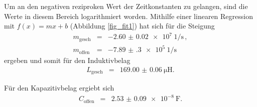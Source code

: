 Um an den negativen reziproken Wert der Zeitkonstanten zu gelangen, sind die Werte in diesem Bereich logarithmiert worden.
Mithilfe einer linearen Regression mit $f(x)=mx+b$ (Abbildung \ref{fig_fit1}) hat sich für die Steigung
\begin{eqnarray*}
	m_\text{gesch} &=& \SI{-2.60(2)e7}{1\per\second}\,,\\
	m_\text{offen} &=& \SI{-7.89(30)e5}{1\per\second}
	\end{eqnarray*}
ergeben und somit für den Induktivbelag
\begin{eqnarray*}
	L_\text{gesch} &=& \SI{169.00(6)}{\micro\henry}.
\end{eqnarray*}

Für den Kapazitivbelag ergiebt sich
\begin{eqnarray*}
	C_\text{offen} &=& \SI{2.53(9)e-8}{\farad}.
\end{eqnarray*}

